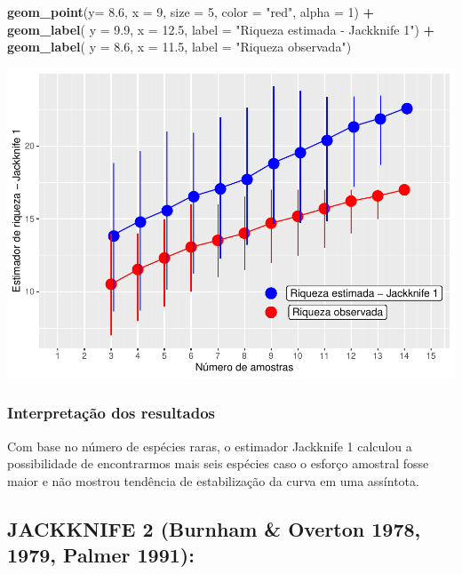 \documentclass[
]{book}
\newenvironment{Shaded}{\begin{snugshade}}{\end{snugshade}}
\newcommand{\DataTypeTok}[1]{\textcolor[rgb]{0.13,0.29,0.53}{#1}}
\newcommand{\DecValTok}[1]{\textcolor[rgb]{0.00,0.00,0.81}{#1}}
\newcommand{\FloatTok}[1]{\textcolor[rgb]{0.00,0.00,0.81}{#1}}
\newcommand{\KeywordTok}[1]{\textcolor[rgb]{0.13,0.29,0.53}{\textbf{#1}}}
\newcommand{\NormalTok}[1]{#1}
\newcommand{\OperatorTok}[1]{\textcolor[rgb]{0.81,0.36,0.00}{\textbf{#1}}}
\newcommand{\StringTok}[1]{\textcolor[rgb]{0.31,0.60,0.02}{#1}}
\begin{document}
\begin{Shaded}
\begin{Highlighting}[]
\StringTok{  }\KeywordTok{geom_point}\NormalTok{(}\DataTypeTok{y=} \FloatTok{8.6}\NormalTok{, }\DataTypeTok{x =} \DecValTok{9}\NormalTok{, }\DataTypeTok{size =} \DecValTok{5}\NormalTok{, }\DataTypeTok{color =} \StringTok{"red"}\NormalTok{, }\DataTypeTok{alpha =} \DecValTok{1}\NormalTok{) }\OperatorTok{+}\StringTok{ }
\StringTok{  }\KeywordTok{geom_label}\NormalTok{( }\DataTypeTok{y =} \FloatTok{9.9}\NormalTok{, }\DataTypeTok{x =} \FloatTok{12.5}\NormalTok{, }\DataTypeTok{label =} \StringTok{"Riqueza estimada - Jackknife 1"}\NormalTok{) }\OperatorTok{+}
\StringTok{  }\KeywordTok{geom_label}\NormalTok{( }\DataTypeTok{y =} \FloatTok{8.6}\NormalTok{, }\DataTypeTok{x =} \FloatTok{11.5}\NormalTok{, }\DataTypeTok{label =} \StringTok{"Riqueza observada"}\NormalTok{)}
\end{Highlighting}
\end{Shaded}

\includegraphics{livro_r_ecologia_files/figure-latex/unnamed-chunk-50-1.pdf}

\hypertarget{interpretauxe7uxe3o-dos-resultados-3}{%
\subsubsection{Interpretação dos resultados}\label{interpretauxe7uxe3o-dos-resultados-3}}

Com base no número de espécies raras, o estimador Jackknife 1 calculou a possibilidade de encontrarmos mais seis espécies caso o esforço amostral fosse maior e não mostrou tendência de estabilização da curva em uma assíntota.

\hypertarget{jackknife-2-burnham-overton-1978-1979-palmer-1991}{%
\subsection{JACKKNIFE 2 (Burnham \& Overton 1978, 1979, Palmer 1991):}\label{jackknife-2-burnham-overton-1978-1979-palmer-1991}}
\end{document}
